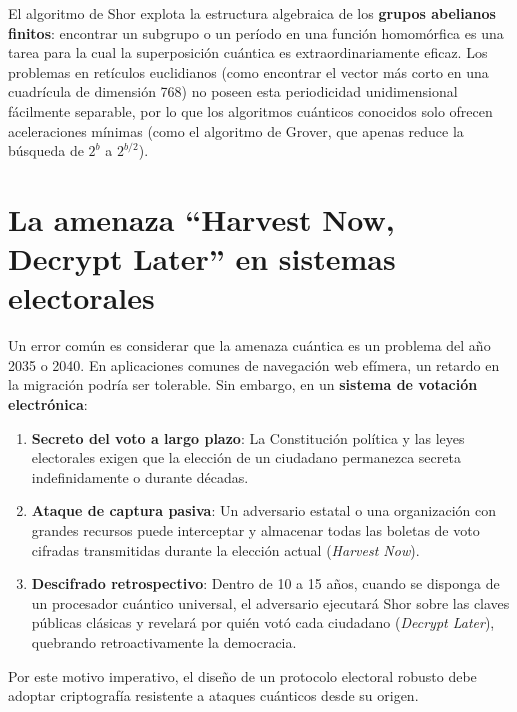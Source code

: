 \documentclass[11pt,a4paper,twoside,openright]{book}
\theoremstyle{plain}
\theoremstyle{definition}
\theoremstyle{remark}
\begin{document}
\begin{intuicion}
El algoritmo de Shor explota la estructura algebraica de los \textbf{grupos abelianos finitos}: encontrar un subgrupo o un per\'iodo en una funci\'on homom\'orfica es una tarea para la cual la superposici\'on cu\'antica es extraordinariamente eficaz. Los problemas en ret\'iculos euclidianos (como encontrar el vector m\'as corto en una cuadr\'icula de dimensi\'on 768) no poseen esta periodicidad unidimensional f\'acilmente separable, por lo que los algoritmos cu\'anticos conocidos solo ofrecen aceleraciones m\'inimas (como el algoritmo de Grover, que apenas reduce la b\'usqueda de $2^b$ a $2^{b/2}$).
\end{intuicion}

\section{La amenaza ``Harvest Now, Decrypt Later'' en sistemas electorales}

Un error com\'un es considerar que la amenaza cu\'antica es un problema del a\~no 2035 o 2040. En aplicaciones comunes de navegaci\'on web ef\'imera, un retardo en la migraci\'on podr\'ia ser tolerable. Sin embargo, en un \textbf{sistema de votaci\'on electr\'onica}:

\begin{enumerate}
  \item \textbf{Secreto del voto a largo plazo}: La Constituci\'on pol\'itica y las leyes electorales exigen que la elecci\'on de un ciudadano permanezca secreta indefinidamente o durante d\'ecadas.
  \item \textbf{Ataque de captura pasiva}: Un adversario estatal o una organizaci\'on con grandes recursos puede interceptar y almacenar todas las boletas de voto cifradas transmitidas durante la elecci\'on actual (\emph{Harvest Now}).
  \item \textbf{Descifrado retrospectivo}: Dentro de 10 a 15 a\~nos, cuando se disponga de un procesador cu\'antico universal, el adversario ejecutar\'a Shor sobre las claves p\'ublicas cl\'asicas y revelar\'a por qui\'en vot\'o cada ciudadano (\emph{Decrypt Later}), quebrando retroactivamente la democracia.
\end{enumerate}

Por este motivo imperativo, el dise\~no de un protocolo electoral robusto debe adoptar criptograf\'ia resistente a ataques cu\'anticos desde su origen.
\end{document}
